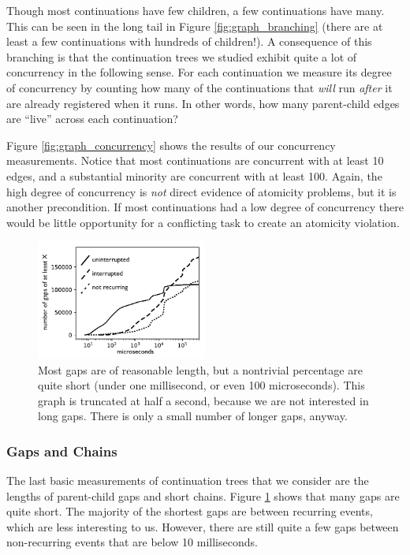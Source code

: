 \documentclass[acmsmall,anonymous,review]{acmart}\settopmatter{printfolios=true,printccs=false,printacmref=false}
\begin{document}
Though most continuations have few children, a few continuations have many.
This can be seen in the long tail in Figure \ref{fig:graph_branching} (there are at least a few continuations with hundreds of children!).
A consequence of this branching is that the continuation trees we studied exhibit quite a lot of concurrency in the following sense.
For each continuation we measure its degree of concurrency by counting how many of the continuations that \emph{will} run \emph{after} it are already registered when it runs.
In other words, how many parent-child edges are ``live'' across each continuation?

Figure \ref{fig:graph_concurrency} shows the results of our concurrency measurements.
Notice that most continuations are concurrent with at least 10 edges, and a substantial minority are concurrent with at least 100.
Again, the high degree of concurrency is \emph{not} direct evidence of atomicity problems, but it is another precondition.
If most continuations had a low degree of concurrency there would be little opportunity for a conflicting task to create an atomicity violation.

\begin{figure}
\hspace*{-0.2cm}\includegraphics[width=0.5\textwidth]{gaps_graph_bw}
\caption{Most gaps are of reasonable length, but a nontrivial percentage are quite short (under one millisecond, or even 100 microseconds).
  This graph is truncated at half a second, because we are not interested in long gaps.
  There is only a small number of longer gaps, anyway.}
\label{fig:graph_gaps}
\end{figure}

\subsubsection{Gaps and Chains}

The last basic measurements of continuation trees that we consider are the lengths of parent-child gaps and short chains.
Figure \ref{fig:graph_gaps} shows that many gaps are quite short.
The majority of the shortest gaps are between recurring events, which are less interesting to us.
However, there are still quite a few gaps between non-recurring events that are below 10 milliseconds.
\end{document}
